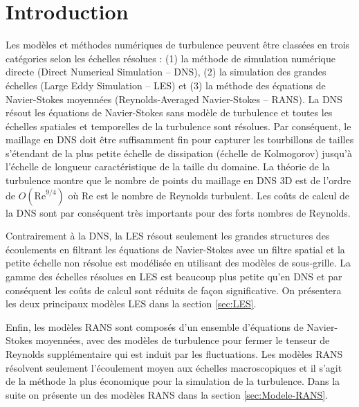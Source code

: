 \chapter{Introduction}
Les mod\`eles et m\'ethodes num\'eriques de turbulence peuvent \^etre class\'ees
en trois cat\'egories selon les \'echelles r\'esolues : (1) la m\'ethode de
simulation num\'erique directe (Direct Numerical Simulation -- DNS),
(2) la simulation des grandes \'echelles (Large Eddy Simulation -- LES)
et (3) la m\'ethode des \'equations de Navier-Stokes moyenn\'ees (Reynolds-Averaged
Navier-Stokes -- RANS). La DNS r\'esout les \'equations de Navier-Stokes
sans mod\`ele de turbulence et toutes les \'echelles spatiales et temporelles
de la turbulence sont r\'esolues. Par cons\'equent, le maillage en DNS
doit \^etre suffisamment fin pour capturer les tourbillons de tailles
s'\'etendant de la plus petite \'echelle de dissipation (\'echelle de Kolmogorov)
jusqu'\`a l'\'echelle de longueur caract\'eristique de la taille du domaine.
La th\'eorie de la turbulence montre que le nombre de points du maillage
en DNS 3D est de l'ordre de $O(\mbox{Re}^{9/4})$ o\`u $\mbox{Re}$
est le nombre de Reynolds turbulent. Les co\^uts de calcul de la DNS
sont par cons\'equent tr\`es importants pour des forts nombres de Reynolds.

Contrairement \`a la DNS, la LES r\'esout seulement les grandes structures
des \'ecoulements en filtrant les \'equations de Navier-Stokes avec un
filtre spatial et la petite \'echelle non r\'esolue est mod\'elis\'ee en utilisant
des mod\`eles de sous-grille. La gamme des \'echelles r\'esolues en LES
est beaucoup plus petite qu'en DNS et par cons\'equent les co\^uts de
calcul sont r\'eduits de fa\c con significative. On pr\'esentera les deux
principaux mod\`eles LES dans la section \ref{sec:LES}.

Enfin, les mod\`eles RANS sont compos\'es d'un ensemble d'\'equations de
Navier-Stokes moyenn\'ees, avec des mod\`eles de turbulence pour fermer
le tenseur de Reynolds suppl\'ementaire qui est induit par les fluctuations.
Les mod\`eles RANS r\'esolvent seulement l'\'ecoulement moyen aux \'echelles
macroscopiques et il s'agit de la m\'ethode la plus \'economique pour
la simulation de la turbulence. Dans la suite on pr\'esente un des mod\`eles
RANS dans la section \ref{sec:Modele-RANS}.


